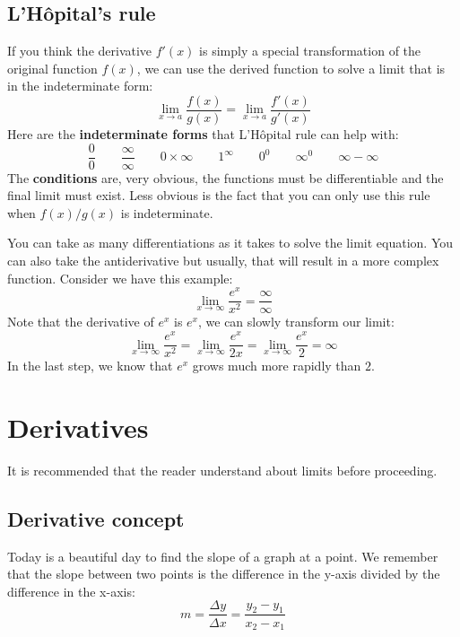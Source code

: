 \section{L'Hôpital's rule} \label{sec:m-limit-hopital}
If you think the derivative $f'(x)$ is simply a special transformation of the original function $f(x)$, we can use the derived function to solve a limit that is in the indeterminate form:
\begin{equation}
    \lim_{x\to a} \frac{f(x)}{g(x)}
    = \lim_{x\to a} \frac{f'(x)}{g'(x)}
\end{equation}
Here are the \textbf{indeterminate forms} that L'Hôpital rule can help with:
\begin{equation}
    \frac{0}{0} \qquad
    \frac{\infty}{\infty} \qquad
    0\times\infty \qquad
    1^\infty \qquad
    0^0 \qquad
    \infty^0 \qquad
    \infty - \infty
\end{equation}
The \textbf{conditions} are, very obvious, the functions must be differentiable and the final limit must exist. Less obvious is the fact that you can only use this rule when $f(x)/g(x)$ is indeterminate.

You can take as many differentiations as it takes to solve the limit equation. You can also take the antiderivative but usually, that will result in a more complex function. Consider we have this example:
\[
    \lim_{x\to\infty} \frac{e^x}{x^2}
    = \frac{\infty}{\infty}
\]
Note that the derivative of $e^x$ is $e^x$, we can slowly transform our limit:
\[
    \lim_{x\to\infty} \frac{e^x}{x^2}
    = \lim_{x\to\infty} \frac{e^x}{2x}
    = \lim_{x\to\infty} \frac{e^x}{2}
    = \infty
\]
In the last step, we know that $e^x$ grows much more rapidly than $2$.

\chapter{Derivatives}
It is recommended that the reader understand about limits before proceeding.

\section{Derivative concept}
Today is a beautiful day to find the slope of a graph at a point. We remember that the slope between two points is the difference in the y-axis divided by the difference in the x-axis:
\begin{equation}
    m
    = \frac{\Delta y}{\Delta x}
    = \frac{y_2-y_1}{x_2-x_1}
\end{equation}

